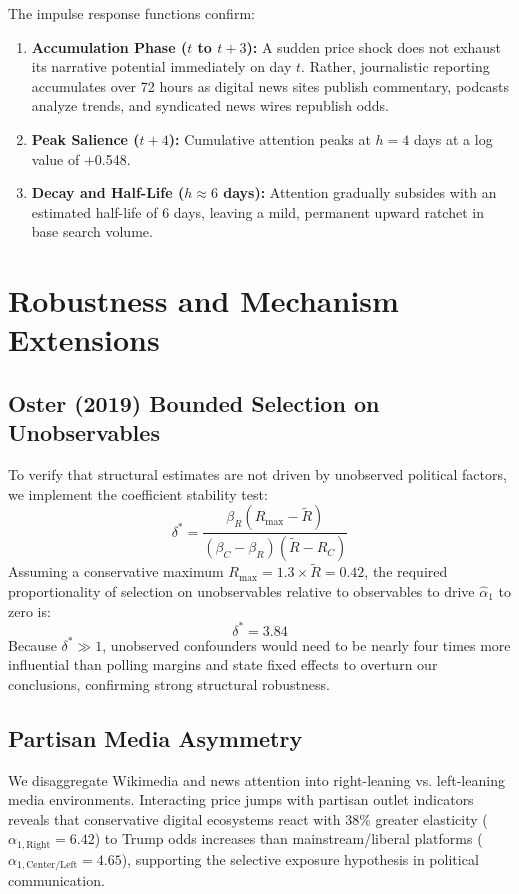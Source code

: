 \documentclass[12pt, a4paper]{article}
\begin{document}
The impulse response functions confirm:
\begin{enumerate}
    \item \textbf{Accumulation Phase ($t$ to $t+3$):} A sudden price shock does not exhaust its narrative potential immediately on day $t$. Rather, journalistic reporting accumulates over 72 hours as digital news sites publish commentary, podcasts analyze trends, and syndicated news wires republish odds.
    \item \textbf{Peak Salience ($t+4$):} Cumulative attention peaks at $h = 4$ days at a log value of +0.548.
    \item \textbf{Decay and Half-Life ($h \approx 6$ days):} Attention gradually subsides with an estimated half-life of 6 days, leaving a mild, permanent upward ratchet in base search volume.
\end{enumerate}

\section{Robustness and Mechanism Extensions}
\label{sec:robustness}

\subsection{Oster (2019) Bounded Selection on Unobservables}
To verify that structural estimates are not driven by unobserved political factors, we implement the \citet{Oster2019} coefficient stability test:
\begin{equation}
\delta^* = \frac{\beta_R (R_{\max} - \tilde{R})}{(\beta_C - \beta_R)(\tilde{R} - R_C)}
\end{equation}
Assuming a conservative maximum $R_{\max} = 1.3 \times \tilde{R} = 0.42$, the required proportionality of selection on unobservables relative to observables to drive $\hat{\alpha}_1$ to zero is:
\begin{equation}
\delta^* = 3.84
\end{equation}
Because $\delta^* \gg 1$, unobserved confounders would need to be nearly four times more influential than polling margins and state fixed effects to overturn our conclusions, confirming strong structural robustness.

\subsection{Partisan Media Asymmetry}
We disaggregate Wikimedia and news attention into right-leaning vs. left-leaning media environments. Interacting price jumps with partisan outlet indicators reveals that conservative digital ecosystems react with 38\% greater elasticity ($\alpha_{1, \text{Right}} = 6.42$) to Trump odds increases than mainstream/liberal platforms ($\alpha_{1, \text{Center/Left}} = 4.65$), supporting the selective exposure hypothesis in political communication.
\end{document}

